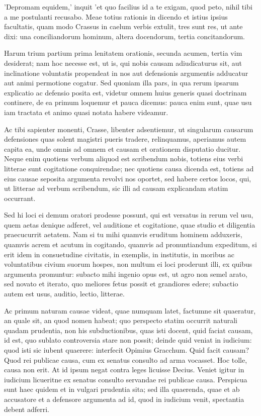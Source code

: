 'Depromam equidem,' inquit 'et quo facilius id a te exigam, quod peto, nihil tibi a me postulanti recusabo. Meae totius rationis in dicendo et istius ipsius facultatis, quam modo Crassus in caelum verbis extulit, tres sunt res, ut ante dixi: una conciliandorum hominum, altera docendorum, tertia concitandorum.

 Harum trium partium prima lenitatem orationis, secunda acumen, tertia vim desiderat; nam hoc necesse est, ut is, qui nobis causam adiudicaturus sit, aut inclinatione voluntatis propendeat in nos aut defensionis argumentis adducatur aut animi permotione cogatur. Sed quoniam illa pars, in qua rerum ipsarum explicatio ac defensio posita est, videtur omnem huius generis quasi doctrinam continere, de ea primum loquemur et pauca dicemus: pauca enim sunt, quae usu iam tractata et animo quasi notata habere videamur.

 Ac tibi sapienter monenti, Crasse, libenter adsentiemur, ut singularum causarum defensiones quas solent magistri pueris tradere, relinquamus, aperiamus autem capita ea, unde omnis ad omnem et causam et orationem disputatio ducitur. Neque enim quotiens verbum aliquod est scribendum nobis, totiens eius verbi litterae sunt cogitatione conquirendae; nec quotiens causa dicenda est, totiens ad eius causae seposita argumenta revolvi nos oportet, sed habere certos locos, qui, ut litterae ad verbum scribendum, sic illi ad causam explicandam statim occurrant.

 Sed hi loci ei demum oratori prodesse possunt, qui est versatus in rerum vel usu, quem aetas denique adferet, vel auditione et cogitatione, quae studio et diligentia praecucurrit aetatem. Nam si tu mihi quamvis eruditum hominem adduxeris, quamvis acrem et acutum in cogitando, quamvis ad pronuntiandum expeditum, si erit idem in consuetudine civitatis, in exemplis, in institutis, in moribus ac voluntatibus civium suorum hospes, non multum ei loci proderunt illi, ex quibus argumenta promuntur: subacto mihi ingenio opus est, ut agro non semel arato, sed novato et iterato, quo meliores fetus possit et grandiores edere; subactio autem est usus, auditio, lectio, litterae.

 Ac primum naturam causae videat, quae numquam latet, factumne sit quaeratur, an quale sit, an quod nomen habeat; quo perspecto statim occurrit naturali quadam prudentia, non his subductionibus, quas isti docent, quid faciat causam, id est, quo sublato controversia stare non possit; deinde quid veniat in iudicium: quod isti sic iubent quaerere: interfecit Opimius Gracchum. Quid facit causam? Quod rei publicae causa, cum ex senatus consulto ad arma vocasset. Hoc tolle, causa non erit. At id ipsum negat contra leges licuisse Decius. Veniet igitur in iudicium licueritne ex senatus consulto servandae rei publicae causa. Perspicua sunt haec quidem et in vulgari prudentia sita; sed illa quaerenda, quae et ab accusatore et a defensore argumenta ad id, quod in iudicium venit, spectantia debent adferri.

